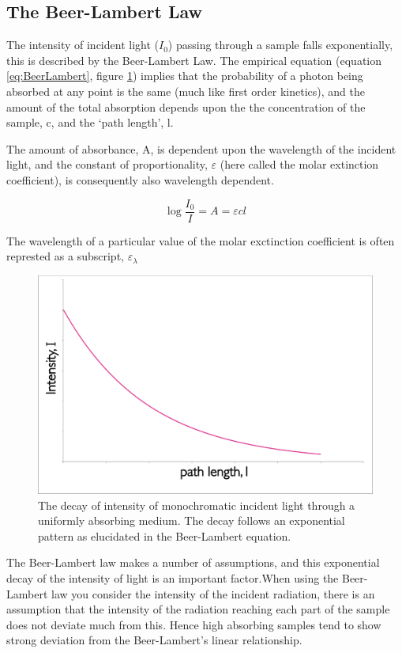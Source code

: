 \documentclass[
]{book}
\begin{document}
\hypertarget{the-beer-lambert-law}{%
\subsection{The Beer-Lambert Law}\label{the-beer-lambert-law}}

The intensity of incident light (\(I_0\)) passing through a sample falls exponentially, this is described by the Beer-Lambert Law. The empirical equation (equation \eqref{eq:BeerLambert}, figure \ref{fig:BeerLambert}) implies that the probability of a photon being absorbed at any point is the same (much like first order kinetics), and the amount of the total absorption depends upon the the concentration of the sample, c, and the `path length', l.

The amount of absorbance, A, is dependent upon the wavelength of the incident light, and the constant of proportionality, \(\varepsilon\) (here called the molar extinction coefficient), is consequently also wavelength dependent.

\begin{equation}
\log \frac{I_0}{I}=A=\varepsilon cl
\label{eq:BeerLambert}
\end{equation}

The wavelength of a particular value of the molar exctinction coefficient is often represted as a subscript, \(\varepsilon _\lambda\)

\begin{figure}

{\centering \includegraphics[width=0.5\linewidth]{images/BeerLambert} 

}

\caption{The decay of intensity of monochromatic incident light through a uniformly absorbing medium. The decay follows an exponential pattern as elucidated in the Beer-Lambert equation.}\label{fig:BeerLambert}
\end{figure}

The Beer-Lambert law makes a number of assumptions, and this exponential decay of the intensity of light is an important factor.When using the Beer-Lambert law you consider the intensity of the incident radiation, there is an assumption that the intensity of the radiation reaching each part of the sample does not deviate much from this. Hence high absorbing samples tend to show strong deviation from the Beer-Lambert's linear relationship.
\end{document}
